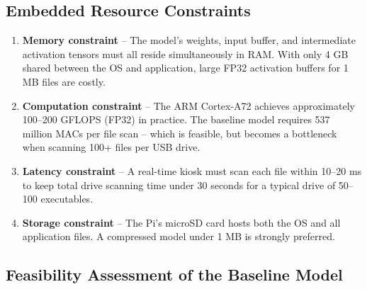 \documentclass[12pt,a4paper]{article}
\begin{document}
\subsection{Embedded Resource Constraints}

\begin{tcolorbox}[infobox, title={Key EAI Embedded Constraints}]
\begin{enumerate}
  \item \textbf{Memory constraint} -- The model's weights, input buffer, and
        intermediate activation tensors must all reside simultaneously in RAM.
        With only 4 GB shared between the OS and application, large FP32
        activation buffers for 1 MB files are costly.
  \item \textbf{Computation constraint} -- The ARM Cortex-A72 achieves
        approximately 100--200 GFLOPS (FP32) in practice.  The baseline model
        requires 537 million MACs per file scan -- which is feasible, but
        becomes a bottleneck when scanning 100+ files per USB drive.
  \item \textbf{Latency constraint} -- A real-time kiosk must scan each file
        within 10--20 ms to keep total drive scanning time under 30 seconds
        for a typical drive of 50--100 executables.
  \item \textbf{Storage constraint} -- The Pi's microSD card hosts both the OS
        and all application files.  A compressed model under 1 MB is strongly
        preferred.
\end{enumerate}
\end{tcolorbox}

\subsection{Feasibility Assessment of the Baseline Model}
\end{document}
